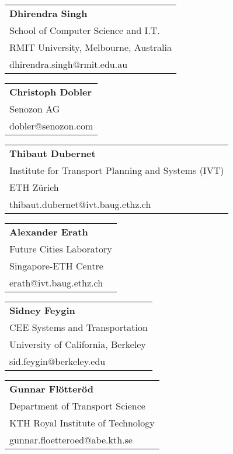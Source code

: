\begin{tabular}[width=0.48\textwidth]{@{}l}
\textbf{Dhirendra Singh} \\
School of Computer Science and I.T. \\
RMIT University, Melbourne, Australia \\
dhirendra.singh@rmit.edu.au \\
\end{tabular}

\begin{tabular}[width=0.48\textwidth]{@{}l}
\textbf{Christoph Dobler} \\
Senozon AG \\
dobler@senozon.com \\
\end{tabular}

\begin{tabular}[width=0.48\textwidth]{@{}l}
\textbf{Thibaut Dubernet} \\
Institute for Transport Planning and Systems (IVT) \\
ETH Zürich \\
thibaut.dubernet@ivt.baug.ethz.ch \\
\end{tabular}

\begin{tabular}[width=0.48\textwidth]{@{}l}
\textbf{Alexander Erath} \\
Future Cities Laboratory \\
Singapore-ETH Centre\\
erath@ivt.baug.ethz.ch \\
\end{tabular}

\begin{tabular}[width=0.48\textwidth]{@{}l}
\textbf{Sidney Feygin} \\
CEE Systems and Transportation \\
University of California, Berkeley \\
sid.feygin@berkeley.edu \\
\end{tabular}

\begin{tabular}[width=0.48\textwidth]{@{}l}
\textbf{Gunnar Flötteröd} \\
Department of Transport Science \\
KTH Royal Institute of Technology \\
gunnar.floetteroed@abe.kth.se \\
\end{tabular}

